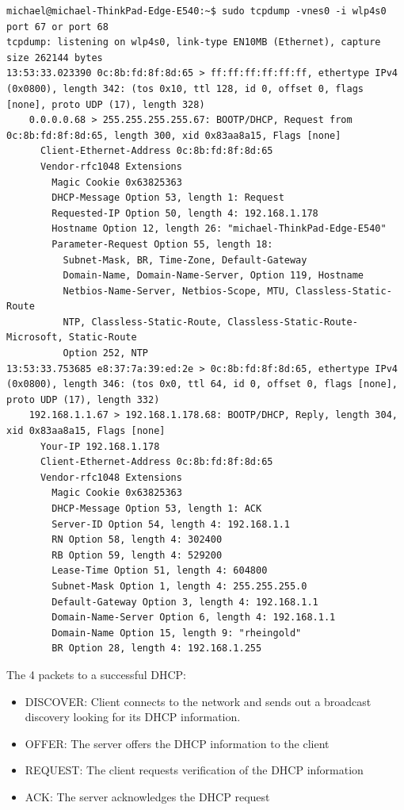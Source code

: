 \begin{lstlisting}
michael@michael-ThinkPad-Edge-E540:~$ sudo tcpdump -vnes0 -i wlp4s0 port 67 or port 68
tcpdump: listening on wlp4s0, link-type EN10MB (Ethernet), capture size 262144 bytes
13:53:33.023390 0c:8b:fd:8f:8d:65 > ff:ff:ff:ff:ff:ff, ethertype IPv4 (0x0800), length 342: (tos 0x10, ttl 128, id 0, offset 0, flags [none], proto UDP (17), length 328)
    0.0.0.0.68 > 255.255.255.255.67: BOOTP/DHCP, Request from 0c:8b:fd:8f:8d:65, length 300, xid 0x83aa8a15, Flags [none]
	  Client-Ethernet-Address 0c:8b:fd:8f:8d:65
	  Vendor-rfc1048 Extensions
	    Magic Cookie 0x63825363
	    DHCP-Message Option 53, length 1: Request
	    Requested-IP Option 50, length 4: 192.168.1.178
	    Hostname Option 12, length 26: "michael-ThinkPad-Edge-E540"
	    Parameter-Request Option 55, length 18: 
	      Subnet-Mask, BR, Time-Zone, Default-Gateway
	      Domain-Name, Domain-Name-Server, Option 119, Hostname
	      Netbios-Name-Server, Netbios-Scope, MTU, Classless-Static-Route
	      NTP, Classless-Static-Route, Classless-Static-Route-Microsoft, Static-Route
	      Option 252, NTP
13:53:33.753685 e8:37:7a:39:ed:2e > 0c:8b:fd:8f:8d:65, ethertype IPv4 (0x0800), length 346: (tos 0x0, ttl 64, id 0, offset 0, flags [none], proto UDP (17), length 332)
    192.168.1.1.67 > 192.168.1.178.68: BOOTP/DHCP, Reply, length 304, xid 0x83aa8a15, Flags [none]
	  Your-IP 192.168.1.178
	  Client-Ethernet-Address 0c:8b:fd:8f:8d:65
	  Vendor-rfc1048 Extensions
	    Magic Cookie 0x63825363
	    DHCP-Message Option 53, length 1: ACK
	    Server-ID Option 54, length 4: 192.168.1.1
	    RN Option 58, length 4: 302400
	    RB Option 59, length 4: 529200
	    Lease-Time Option 51, length 4: 604800
	    Subnet-Mask Option 1, length 4: 255.255.255.0
	    Default-Gateway Option 3, length 4: 192.168.1.1
	    Domain-Name-Server Option 6, length 4: 192.168.1.1
	    Domain-Name Option 15, length 9: "rheingold"
	    BR Option 28, length 4: 192.168.1.255
\end{lstlisting}

The 4 packets to a successful DHCP:
\begin{itemize}
    \item DISCOVER: Client connects to the network and sends out a broadcast discovery looking for its DHCP information.
    \item OFFER: The server offers the DHCP information to the client
    \item REQUEST: The client requests verification of the DHCP information
    \item ACK: The server acknowledges the DHCP request
\end{itemize}

